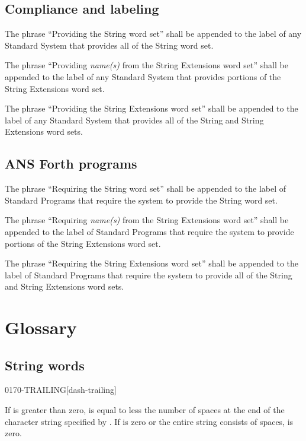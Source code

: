 \subsection{Compliance and labeling} %

The phrase ``Providing the String word set'' shall be appended to
the label of any Standard System that provides all of the String
word set.

The phrase ``Providing \emph{name(s)} from the String Extensions
word set'' shall be appended to the label of any Standard System
that provides portions of the String Extensions word set.

The phrase ``Providing the String Extensions word set'' shall be
appended to the label of any Standard System that provides all of
the String and String Extensions word sets.

\subsection{ANS Forth programs} %

The phrase ``Requiring the String word set'' shall be appended to
the label of Standard Programs that require the system to provide
the String word set.

The phrase ``Requiring \emph{name(s)} from the String Extensions
word set'' shall be appended to the label of Standard Programs that
require the system to provide portions of the String Extensions
word set.

The phrase ``Requiring the String Extensions word set'' shall be
appended to the label of Standard Programs that require the system
to provide all of the String and String Extensions word sets.


\section{Glossary} %

\subsection{String words} %


\begin{worddef}{0170}{-TRAILING}[dash-trailing]
\item {}

	If  is greater than zero,  is equal to
	 less the number of spaces at the end of the
	character string specified by . If 
	is zero or the entire string consists of spaces,  is
	zero.
\end{worddef}


